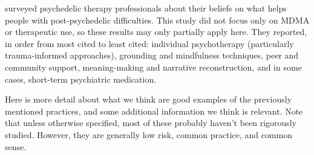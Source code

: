 \documentclass[12pt,letterpaper]{book}
\begin{document}
\textcite{argyri2025practitioner} surveyed psychedelic therapy professionals about their beliefs on what helps people with post-psychedelic difficulties. This study did not focus only on MDMA or therapeutic use, so these results may only partially apply here. They reported, in order from most cited to least cited: individual psychotherapy (particularly trauma-informed approaches), grounding and mindfulness techniques, peer and community support, meaning-making and narrative reconstruction, and in some cases, short-term psychiatric medication.

Here is more detail about what we think are good examples of the previously mentioned practices, and some additional information we think is relevant. Note that unless otherwise specified, most of these probably haven't been rigorously studied. However, they are generally low risk, common practice, and common sense. 
\end{document}
